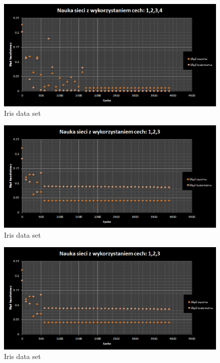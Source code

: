 \documentclass{classrep}
\begin{document}
\\

\begin{figure}[ht]
\centering
			\includegraphics[scale=0.65]{pictures/Iris01.png}
	\caption{Iris data set}
	\label{fig:Iris data set}
\end{figure}

\begin{figure}[ht]
\centering
			\includegraphics[scale=0.65]{pictures/Iris02.png}
	\caption{Iris data set}
	\label{fig:Iris data set}
\end{figure}

\begin{figure}[ht]
\centering
			\includegraphics[scale=0.65]{pictures/Iris03.png}
	\caption{Iris data set}
	\label{fig:Iris data set}
\end{figure}
\end{document}

